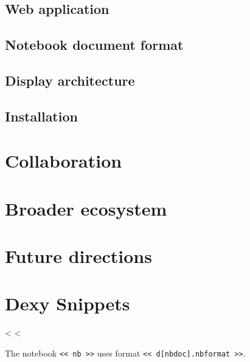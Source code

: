 \documentclass[12pt]{article}
\begin{document}
\subsection{Web application}

%

\subsection{Notebook document format}

\subsection{Display architecture}

\subsection{Installation}

\section{Collaboration}

\section{Broader ecosystem}

\section{Future directions}

\section*{Dexy Snippets}

<%
<%

The notebook \verb|<< nb >>| uses format \verb|<< d[nbdoc].nbformat >>|.
\end{document}
